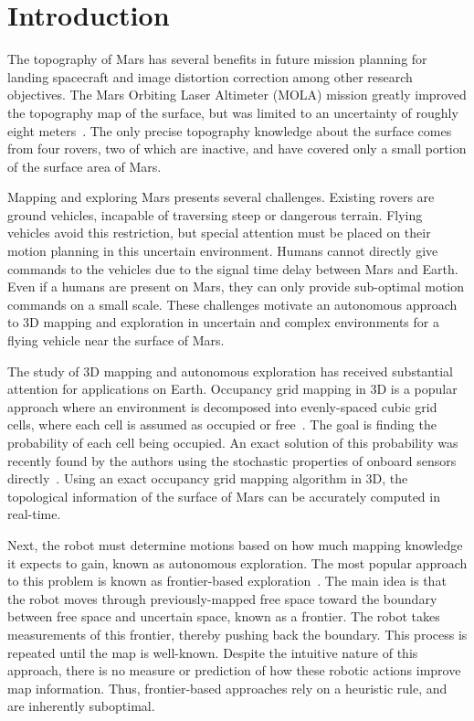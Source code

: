 \documentclass[conf]{new-aiaa}
\begin{document}
\section{Introduction}

The topography of Mars has several benefits in future mission planning for landing spacecraft and  image distortion correction among other research objectives. The Mars Orbiting Laser Altimeter (MOLA) mission greatly improved the topography map of the surface, but was limited to an uncertainty of roughly eight meters~\cite{MOLA99}. The only precise topography knowledge about the surface comes from four rovers, two of which are inactive, and have covered only a small portion of the surface area of Mars.

Mapping and exploring Mars presents several challenges. Existing rovers are ground vehicles, incapable of traversing steep or dangerous terrain. Flying vehicles avoid this restriction, but special attention must be placed on their motion planning in this uncertain environment. Humans cannot directly give commands to the vehicles due to the signal time delay between Mars and Earth. Even if a humans are present on Mars, they can only provide sub-optimal motion commands on a small scale. These challenges motivate an autonomous approach to 3D mapping and exploration in uncertain and complex environments for a flying vehicle near the surface of Mars.

The study of 3D mapping and autonomous exploration has received substantial attention for applications on Earth. Occupancy grid mapping in 3D is a popular approach where an environment is decomposed into evenly-spaced cubic grid cells, where each cell is assumed as occupied or free~\cite{ThrBurFox05,WurHorBenStaBur10}. The goal is finding the probability of each cell being occupied. An exact solution of this probability was recently found by the authors using the stochastic properties of onboard sensors directly~\cite{KauLeeAiMos16,KauTakAiLee17}. Using an exact occupancy grid mapping algorithm in 3D, the topological information of the surface of Mars can be accurately computed in real-time.

Next, the robot must determine motions based on how much mapping knowledge it expects to gain, known as autonomous exploration. The most popular approach to this problem is known as frontier-based exploration~\cite{ZhuDinLinWu15,SenWan16,KleDor13}. The main idea is that the robot moves through previously-mapped free space toward the boundary between free space and uncertain space, known as a frontier. The robot takes measurements of this frontier, thereby pushing back the boundary. This process is repeated until the map is well-known. Despite the intuitive nature of this approach, there is no measure or prediction of how these robotic actions improve map information. Thus, frontier-based approaches rely on a heuristic rule, and are inherently suboptimal.
\end{document}
